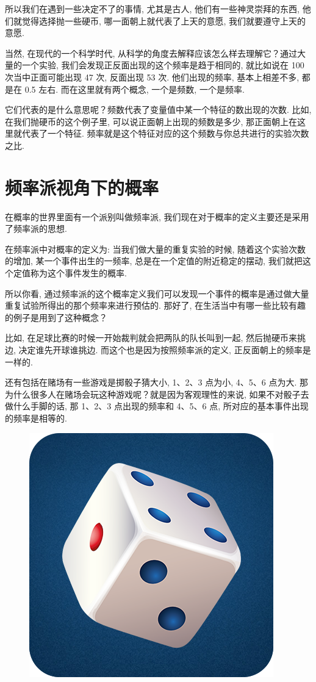 所以我们在遇到一些决定不了的事情, 尤其是古人, 他们有一些神灵崇拜的东西, 他们就觉得选择抛一些硬币, 哪一面朝上就代表了上天的意愿, 我们就要遵守上天的意愿. 

当然, 在现代的一个科学时代, 从科学的角度去解释应该怎么样去理解它？通过大量的一个实验, 我们会发现正反面出现的这个频率是趋于相同的, 就比如说在 100 次当中正面可能出现 47 次, 反面出现 53 次. 他们出现的频率, 基本上相差不多, 都是在 0.5 左右. 而在这里就有两个概念, 一个是频数, 一个是频率. 

它们代表的是什么意思呢？频数代表了变量值中某一个特征的数出现的次数. 比如, 在我们抛硬币的这个例子里, 可以说正面朝上出现的频数是多少, 那正面朝上在这里就代表了一个特征. 频率就是这个特征对应的这个频数与你总共进行的实验次数之比. 

\section{频率派视角下的概率}

在概率的世界里面有一个派别叫做频率派, 我们现在对于概率的定义主要还是采用了频率派的思想. 

在频率派中对概率的定义为: 当我们做大量的重复实验的时候, 随着这个实验次数的增加, 某一个事件出生的一频率, 总是在一个定值的附近稳定的摆动, 我们就把这个定值称为这个事件发生的概率. 

所以你看, 通过频率派的这个概率定义我们可以发现一个事件的概率是通过做大量重复试验所得出的那个频率来进行预估的. 那好了, 在生活当中有哪一些比较有趣的例子是用到了这种概念？

比如, 在足球比赛的时候一开始裁判就会把两队的队长叫到一起, 然后抛硬币来挑边, 决定谁先开球谁挑边. 而这个也是因为按照频率派的定义, 正反面朝上的频率是一样的. 

还有包括在赌场有一些游戏是掷骰子猜大小, 1、2、3 点为小, 4、5、6 点为大. 那为什么很多人在赌场会玩这种游戏呢？就是因为客观理性的来说, 如果不对骰子去做什么手脚的话, 那 1、2、3 点出现的频率和 4、5、6 点, 所对应的基本事件出现的频率是相等的. 

\begin{figure}[ht]
  \centering
  \includegraphics[width=0.3\linewidth]{asset/20230916012942.png}
  \caption{}
  \label{fig:img20_2}
\end{figure}

